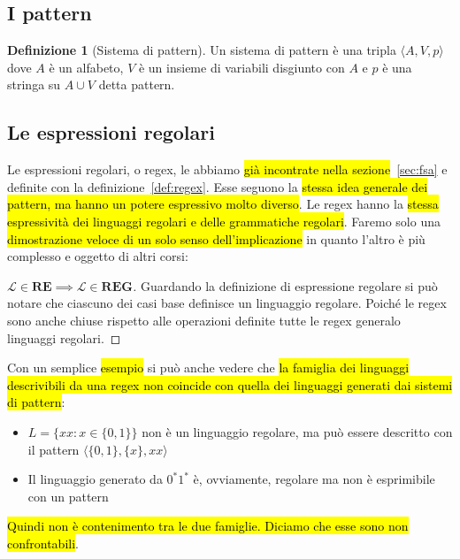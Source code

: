 \documentclass[a4paper,11pt,oneside]{article}
\theoremstyle{plain}
\theoremstyle{definition}
\newtheorem{defn}{Definizione}[section]
\theoremstyle{remark}
\begin{document}
\subsection{I pattern}\label{sec:pattern}

\begin{defn}[Sistema di pattern]
  Un sistema di pattern è una tripla $\langle A, V, p \rangle$ dove $A$ è un
  alfabeto, $V$ è un insieme di variabili disgiunto con $A$ e $p$ è una stringa
  su $A \cup V$ detta pattern.
\end{defn}

\subsection{Le espressioni regolari}\label{sec:regex}

Le espressioni regolari, o regex, le abbiamo \hl{già incontrate nella
sezione}~\ref{sec:fsa} e definite con la definizione~\ref{def:regex}. Esse
seguono la \hl{stessa idea generale dei pattern, ma hanno un potere espressivo
molto diverso}. Le regex hanno la\hl{ stessa espressività dei linguaggi regolari
e delle grammatiche regolari}. Faremo solo una \hl{dimostrazione veloce di un
solo senso dell'implicazione} in quanto l'altro è più complesso e oggetto di
altri corsi:

\begin{proof}[$\mathcal{L}\in\mathbf{RE} \implies \mathcal{L}\in\mathbf{REG}$]%
  \label{proof:equiv-re-reg-1}
  Guardando la definizione di espressione regolare si può notare che ciascuno
  dei casi base definisce un linguaggio regolare. Poiché le regex sono anche
  chiuse rispetto alle operazioni definite tutte le regex generalo linguaggi
  regolari.
\end{proof}

Con un semplice \hl{esempio} si può anche vedere che \hl{la famiglia dei linguaggi
descrivibili da una regex non coincide con quella dei linguaggi generati dai
sistemi di pattern}:

\begin{itemize}
  \item $L = \{xx : x \in \{0,1\}\}$ non è un linguaggio regolare, ma può essere
    descritto con il pattern $\langle \{0,1\}, \{x\}, xx\rangle$
  \item Il linguaggio generato da $0^* 1^*$ è, ovviamente, regolare ma non è
    esprimibile con un pattern
\end{itemize}

\hl{Quindi non è contenimento tra le due famiglie. Diciamo che esse sono non
confrontabili}.
\end{document}

